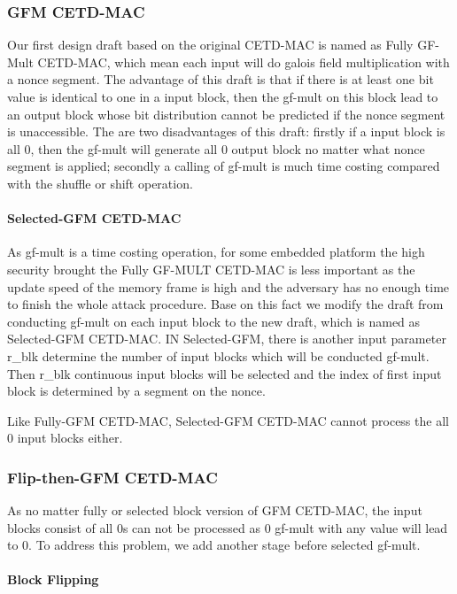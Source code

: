 \subsubsection{GFM CETD-MAC}
Our first design draft based on the original CETD-MAC is named as Fully GF-Mult CETD-MAC, which mean each
input will do galois field multiplication with a nonce segment. The advantage of this draft is that if there is at least one bit value is identical to one in a input block, then the gf-mult on this block lead to an output block whose bit distribution cannot be predicted if the nonce segment is unaccessible. 
The are two disadvantages of this draft: firstly if a input block is all 0, then the gf-mult will generate all 0 output block no matter what nonce segment is applied; secondly a calling of gf-mult is much time costing compared with the shuffle or shift operation. 
\paragraph{Selected-GFM CETD-MAC}
As gf-mult is a time costing operation, for some embedded platform the high security brought the Fully GF-MULT CETD-MAC is less important as the update speed of the memory frame is high and the adversary has no enough time to finish the whole attack procedure. Base on this fact we modify the draft from conducting gf-mult on each input block to the new draft, which is named as Selected-GFM CETD-MAC. IN Selected-GFM, there is another input parameter r\_blk determine the number of input blocks which will be conducted gf-mult. Then r\_blk continuous input blocks will be selected and the index of first input block is determined by a segment on the nonce. 

Like Fully-GFM CETD-MAC, Selected-GFM CETD-MAC cannot process the all 0 input blocks either.
\subsubsection{Flip-then-GFM CETD-MAC}
As no matter fully or selected block version of GFM CETD-MAC, the input blocks consist of all 0s can not be processed as 0 gf-mult with any value will lead to 0. To address this  problem, we add another stage before selected gf-mult.
\paragraph{Block Flipping}
